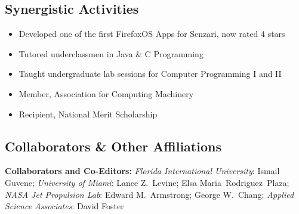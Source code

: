 \documentclass[svgnames,11pt]{article}
\begin{document}
\subsection{Synergistic Activities}

\begin{itemize}[itemsep=0pt]
    \item Developed one of the first FirefoxOS Apps for Senzari, now rated 4 stars
    \item Tutored underclassmen in Java \& C Programming
    \item Taught undergraduate lab sessions for Computer Programming I and II
    \item Member, Association for Computing Machinery
    \item Recipient, National Merit Scholarship
\end{itemize}

\subsection{Collaborators \& Other Affiliations}

\begin{bibsection}

    \item \textbf{Collaborators and Co-Editors:}
        \emph{Florida International University}:
            Ismail Guvenc;
        \emph{University of Miami}:
            Lance Z.~Levine;
            Elsa Maria~Rodriguez~Plaza;
        \emph{NASA Jet Propulsion Lab}:
            Edward M.~Armstrong;
            George W.~Chang;
        \emph{Applied Science Associates}:
            David Foster


\end{bibsection}
\end{document}
